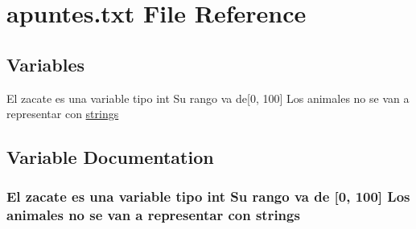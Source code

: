 \hypertarget{apuntes_8txt}{}\section{apuntes.\+txt File Reference}
\label{apuntes_8txt}
\subsection*{Variables}
\begin{DoxyCompactItemize}
\item 
El zacate es una variable tipo int Su rango va de\mbox{[}0, 100\mbox{]} Los animales no se van a representar con \hyperlink{apuntes_8txt_a7fafe4330e5347d2a816fe8b3500cb0e}{strings}
\end{DoxyCompactItemize}


\subsection{Variable Documentation}
\subsubsection[{\texorpdfstring{strings}{strings}}]{\setlength{\rightskip}{0pt plus 5cm}El zacate es una variable tipo int Su rango va de \mbox{[}0, 100\mbox{]} Los animales no se van a representar con strings}\hypertarget{apuntes_8txt_a7fafe4330e5347d2a816fe8b3500cb0e}{}\label{apuntes_8txt_a7fafe4330e5347d2a816fe8b3500cb0e}

